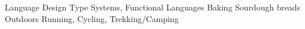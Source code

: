 \begin{cvskills}
  \cvskill
    {Language Design}
    {Type Systems, Functional Languages}
  \cvskill
    {Baking}
    {Sourdough breads}
  \cvskill
    {Outdoors}
    {Running, Cycling, Trekking/Camping}
\end{cvskills}
